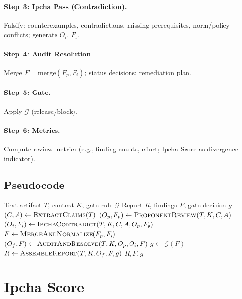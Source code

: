 \documentclass[11pt,a4paper]{article}
\newcommand{\methodname}{\textsc{Ipcha Mistabra}}
\begin{document}
\paragraph{Step~3: Ipcha Pass (Contradiction).}
Falsify: counterexamples, contradictions, missing prerequisites, norm/policy conflicts; generate $O_i$, $F_i$.

\paragraph{Step~4: Audit Resolution.}
Merge $F=\mathrm{merge}(F_p, F_i)$; status decisions; remediation plan.

\paragraph{Step~5: Gate.}
Apply $\mathcal{G}$ (release/block).

\paragraph{Step~6: Metrics.}
Compute review metrics (e.g., finding counts, effort; Ipcha Score as divergence indicator).

\subsection{Pseudocode}
\begin{algorithm}[h]
\caption{\methodname{}: Institutionalized Contradiction for Text Artifact Review}
\begin{algorithmic}[1]
\Require Text artifact $T$, context $K$, gate rule $\mathcal{G}$
\Ensure Report $R$, findings $F$, gate decision $g$
\State $(C,A) \gets \textsc{ExtractClaims}(T)$
\State $(O_p, F_p) \gets \textsc{ProponentReview}(T,K,C,A)$
\State $(O_i, F_i) \gets \textsc{IpchaContradict}(T,K,C,A,O_p,F_p)$
\State $F \gets \textsc{MergeAndNormalize}(F_p,F_i)$
\State $(O_f, F) \gets \textsc{AuditAndResolve}(T,K,O_p,O_i,F)$
\State $g \gets \mathcal{G}(F)$
\State $R \gets \textsc{AssembleReport}(T,K,O_f,F,g)$
\State \Return $R, F, g$
\end{algorithmic}
\end{algorithm}

\section{Ipcha Score}
\end{document}
